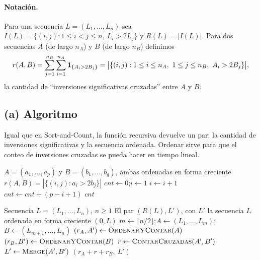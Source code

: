 \paragraph{Notación.} Para una secuencia $L=(L_1,\dots,L_n)$ sea
$I(L)=\{(i,j): 1\le i<j\le n,\ L_i>2L_j\}$ y $R(L)=|I(L)|$. Para dos secuencias $A$ (de
largo $n_A$) y $B$ (de largo $n_B$) definimos
\[
r(A,B)=\sum_{j=1}^{n_B}\sum_{i=1}^{n_A}\ind{A_i>2B_j}
=\bigl|\{(i,j): 1\le i\le n_A,\ 1\le j\le n_B,\ A_i>2B_j\}\bigr|,
\]
la cantidad de ``inversiones significativas cruzadas'' entre $A$ y $B$.

\subsection*{(a) Algoritmo}

Igual que en Sort-and-Count, la función recursiva devuelve un par: la cantidad de
inversiones significativas y la secuencia ordenada. Ordenar sirve para que el conteo de
inversiones cruzadas se pueda hacer en tiempo lineal.

\begin{algorithm}[H]
\caption{Conteo de inversiones significativas cruzadas}
\begin{algorithmic}[1]
\Require $A=(a_1,\dots,a_p)$ y $B=(b_1,\dots,b_q)$, ambas ordenadas en forma creciente
\Ensure $r(A,B)=|\{(i,j): a_i>2b_j\}|$
  \State $cnt\gets 0$;\quad $i\gets 1$
      \State $i\gets i+1$
    \EndWhile
    \State $cnt\gets cnt+(p-i+1)$ 
  \EndFor
  \State \Return $cnt$
\EndFunction
\end{algorithmic}
\end{algorithm}

\begin{algorithm}[H]
\caption{Ordenar y contar inversiones significativas}
\begin{algorithmic}[1]
\Require Secuencia $L=(L_1,\dots,L_n)$, $n\ge1$
\Ensure El par $(R(L),L')$, con $L'$ la secuencia $L$ ordenada en forma creciente
    \State \Return $(0,L)$
  \EndIf
  \State $m\gets\lfloor n/2\rfloor$;\quad $A\gets(L_1,\dots,L_m)$;\quad
         $B\gets(L_{m+1},\dots,L_n)$ 
  \State $(r_A,A')\gets\Call{OrdenarYContar}{A}$
  \State $(r_B,B')\gets\Call{OrdenarYContar}{B}$
  \State $r\gets\Call{ContarCruzadas}{A',B'}$ 
  \State $L'\gets\Call{Merge}{A',B'}$ 
  \State \Return $(r_A+r+r_B,\ L')$
\EndFunction
\end{algorithmic}
\end{algorithm}


